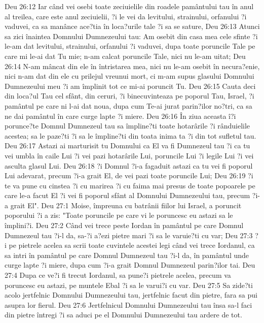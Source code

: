 Deu 26:12  Iar când vei osebi toate zeciuielile din roadele pamântului tau în anul al treilea, care este anul zeciuielii, ?i le vei da levitului, strainului, orfanului ?i vaduvei, ca sa manânce ace?tia în loca?urile tale ?i sa se sature,
Deu 26:13  Atunci sa zici înaintea Domnului Dumnezeului tau: Am osebit din casa mea cele sfinte ?i le-am dat levitului, strainului, orfanului ?i vaduvei, dupa toate poruncile Tale pe care mi le-ai dat Tu mie; n-am calcat poruncile Tale, nici nu le-am uitat;
Deu 26:14  N-am mâncat din ele în întristarea mea, nici nu le-am osebit în necura?enie, nici n-am dat din ele cu prilejul vreunui mort, ci m-am supus glasului Domnului Dumnezeului meu ?i am împlinit tot ce mi-ai poruncit Tu.
Deu 26:15  Cauta deci din loca?ul Tau cel sfânt, din ceruri, ?i binecuvinteaza pe poporul Tau, Israel, ?i pamântul pe care ni l-ai dat noua, dupa cum Te-ai jurat parin?ilor no?tri, ca sa ne dai pamântul în care curge lapte ?i miere.
Deu 26:16  În ziua aceasta î?i porunce?te Domnul Dumnezeul tau sa împline?ti toate hotarârile ?i rânduielile acestea; sa le paze?ti ?i sa le împline?ti din toata inima ta ?i din tot sufletul tau.
Deu 26:17  Astazi ai marturisit tu Domnului ca El va fi Dumnezeul tau ?i ca tu vei umbla în caile Lui ?i vei pazi hotarârile Lui, poruncile Lui ?i legile Lui ?i vei asculta glasul Lui.
Deu 26:18  ?i Domnul ?i-a fagaduit astazi ca tu vei fi poporul Lui adevarat, precum ?i-a grait El, de vei pazi toate poruncile Lui;
Deu 26:19  ?i te va pune cu cinstea ?i cu marirea ?i cu faima mai presus de toate popoarele pe care le-a facut El ?i vei fi poporul sfânt al Domnului Dumnezeului tau, precum ?i-a grait El".
Deu 27:1  Moise, împreuna cu batrânii fiilor lui Israel, a poruncit poporului ?i a zis: "Toate poruncile pe care vi le poruncesc eu astazi sa le împlini?i.
Deu 27:2  Când vei trece peste Iordan în pamântul pe care Domnul Dumnezeul tau ?i-l da, sa-?i a?ezi pietre mari ?i sa le varuie?ti cu var;
Deu 27:3  ?i pe pietrele acelea sa scrii toate cuvintele acestei legi când vei trece Iordanul, ca sa intri în pamântul pe care Domnul Dumnezeul tau ?i-l da, în pamântul unde curge lapte ?i miere, dupa cum ?i-a grait Domnul Dumnezeul parin?ilor tai.
Deu 27:4  Dupa ce ve?i fi trecut Iordanul, sa pune?i pietrele acelea, precum va poruncesc eu astazi, pe muntele Ebal ?i sa le varui?i cu var.
Deu 27:5  Sa zide?ti acolo jertfelnic Domnului Dumnezeului tau, jertfelnic facut din pietre, fara sa pui asupra lor fierul.
Deu 27:6  Jertfelnicul Domnului Dumnezeului tau însa sa-l faci din pietre întregi ?i sa aduci pe el Domnului Dumnezeului tau ardere de tot.
